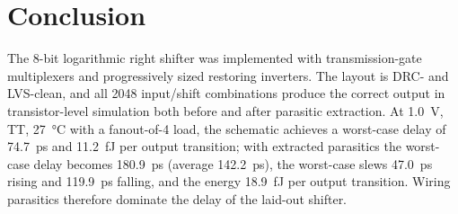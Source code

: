 \documentclass[11pt]{article}
\begin{document}
\section{Conclusion}
The 8-bit logarithmic right shifter was implemented with transmission-gate
multiplexers and progressively sized restoring inverters. The layout is DRC-
and LVS-clean, and all 2048 input/shift combinations produce the correct
output in transistor-level simulation both before and after parasitic
extraction. At \SI{1.0}{V}, TT, \SI{27}{\celsius} with a fanout-of-4 load,
the schematic achieves a worst-case delay of \SI{74.7}{ps} and
\SI{11.2}{fJ} per output transition; with extracted parasitics the
worst-case delay becomes \SI{180.9}{ps} (average \SI{142.2}{ps}), the
worst-case slews \SI{47.0}{ps} rising and \SI{119.9}{ps} falling, and the
energy \SI{18.9}{fJ} per output transition. Wiring parasitics therefore
dominate the delay of the laid-out shifter.
\end{document}
